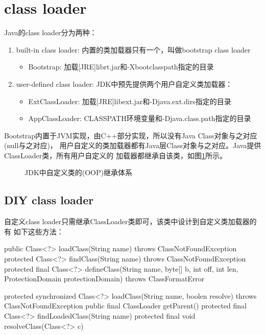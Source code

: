 \section[class loader]{class loader}
Java的class loader分为两种：
\begin{enumerate}
  \item built-in class loader: 内置的类加载器只有一个，叫做bootstrap class loader
    \begin{itemize}
      \item Bootstrap: 加载[JRE]\bs lib\bs rt.jar和-Xbootclasspath指定的目录
    \end{itemize}
  \item user-defined class loader: JDK中预先提供两个用户自定义类加载器：
    \begin{itemize}
      \item ExtClassLoader: 加载[JRE]\bs lib\bs ext\*.jar和-Djava.ext.dirs指定的目录
      \item AppClassLoader: CLASSPATH环境变量和-Djava.class.path指定的目录
    \end{itemize}
\end{enumerate}
Bootstrap内置于JVM实现，由C++部分实现，所以没有Java Class对象与之对应(null与之对应)，
用户自定义的类加载器都有Java层Class对象与之对应。Java提供ClassLoader类，所有用户自定义的
加载器都继承自该类，如图\ref{fig:classloadertree}所示。
\begin{figure}
  \centering
  \caption{JDK中自定义类的(OOP)继承体系}\label{fig:classloadertree}
\end{figure}

\subsection[DIY class loader]{DIY class loader}
自定义class loader只需继承ClassLoader类即可，该类中设计到自定义类加载器的有
如下这些方法：\\
\begin{javacode}
public Class<?> loadClass(String name)
  throws ClassNotFoundException { }
protected Class<?> findClass(String name)
  throws ClassNotFoundException { }
protected final Class<?> defineClass(String name, byte[] b, int off, int len,
  ProtectionDomain protectionDomain) throws ClassFormatError { }

protected synchronized Class<?> loadClass(String name, boolen resolve)
  throws ClassNotFoundException { }
public final ClassLoader getParent(){ }
protected final Class<?> findLoadedClass(String name) { }
protected final void resolveClass(Class<?> c) { }
\end{javacode}

